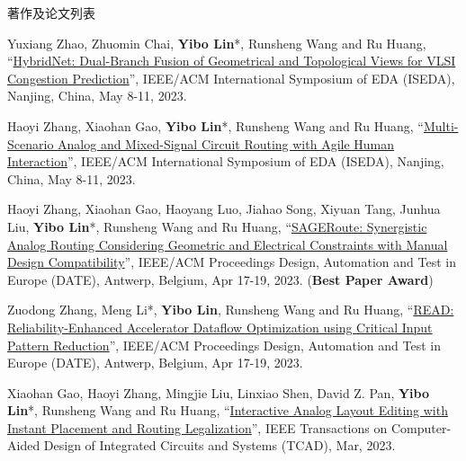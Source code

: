\begin{rSection}{著作及论文列表}
\begin{description}[font=\normalfont, rightmargin=2em]
{}
            

\item[{[C115]}]{
        Yuxiang Zhao, Zhuomin Chai, \textbf{Yibo Lin}*, Runsheng Wang and Ru Huang, 
    ``\href{https://doi.org/10.1109/ISEDA59274.2023.10218656}{HybridNet: Dual-Branch Fusion of Geometrical and Topological Views for VLSI Congestion Prediction}'', 
    IEEE/ACM International Symposium of EDA (ISEDA), Nanjing, China, May 8-11, 2023.
    
}
            

\item[{[C114]}]{
        Haoyi Zhang, Xiaohan Gao, \textbf{Yibo Lin}*, Runsheng Wang and Ru Huang, 
    ``\href{https://doi.org/10.1109/ISEDA59274.2023.10218434}{Multi-Scenario Analog and Mixed-Signal Circuit Routing with Agile Human Interaction}'', 
    IEEE/ACM International Symposium of EDA (ISEDA), Nanjing, China, May 8-11, 2023.
    
}
            

\item[{[C113]}]{
        Haoyi Zhang, Xiaohan Gao, Haoyang Luo, Jiahao Song, Xiyuan Tang, Junhua Liu, \textbf{Yibo Lin}*, Runsheng Wang and Ru Huang, 
    ``\href{https://doi.org/10.23919/DATE56975.2023.10137296}{SAGERoute: Synergistic Analog Routing Considering Geometric and Electrical Constraints with Manual Design Compatibility}'', 
    IEEE/ACM Proceedings Design, Automation and Test in Europe (DATE), Antwerp, Belgium, Apr 17-19, 2023.
    (\textbf{Best Paper Award})
}
            

\item[{[C112]}]{
        Zuodong Zhang, Meng Li*, \textbf{Yibo Lin}, Runsheng Wang and Ru Huang, 
    ``\href{https://doi.org/10.23919/DATE56975.2023.10137254}{READ: Reliability-Enhanced Accelerator Dataflow Optimization using Critical Input Pattern Reduction}'', 
    IEEE/ACM Proceedings Design, Automation and Test in Europe (DATE), Antwerp, Belgium, Apr 17-19, 2023.
    
}
            

\item[{[J111]}]{
        Xiaohan Gao, Haoyi Zhang, Mingjie Liu, Linxiao Shen, David Z. Pan, \textbf{Yibo Lin}*, Runsheng Wang and Ru Huang, 
    ``\href{https://doi.org/10.1109/TCAD.2022.3190234}{Interactive Analog Layout Editing with Instant Placement and Routing Legalization}'', 
    IEEE Transactions on Computer-Aided Design of Integrated Circuits and Systems (TCAD), Mar, 2023.
    
}
            


\end{description}
\end{rSection}
